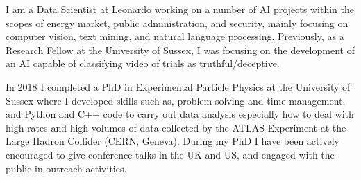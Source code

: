 
I am a Data Scientist at Leonardo working on a number of AI projects within the scopes of energy market, public administration, and security, mainly focusing on computer vision, text mining, and natural language processing. Previously, as a Research Fellow at the University of Sussex, I was focusing on the development of an AI capable of classifying video of trials as truthful/deceptive. 

In 2018 I completed a PhD in Experimental Particle Physics at the University of Sussex where I developed skills such as, problem solving and time management, and Python and C++ code to carry out data analysis especially how to deal with high rates and high volumes of data collected by the ATLAS Experiment at the Large Hadron Collider (CERN, Geneva). During my PhD I have been actively encouraged to give conference talks in the UK and US, and engaged with the public in outreach activities.
